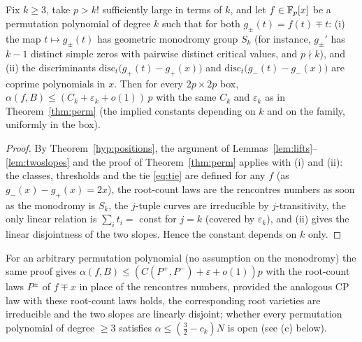 \begin{corollary}\label{cor:permgen}
Fix $k\ge3$, take $p>k!$ sufficiently large in terms of $k$, and let $f\in\mathbb{F}_p[x]$ be a permutation polynomial of degree $k$ such that for both $g_\pm(t)=f(t)\mp t$: (i) the map $t\mapsto g_\pm(t)$ has
geometric monodromy group $S_k$ (for instance, $g_\pm'$ has $k-1$ distinct simple zeros with pairwise distinct critical values, and $p\nmid k$), and (ii) the
discriminants $\mathrm{disc}_t\bigl(g_+(t)-g_+(x)\bigr)$ and $\mathrm{disc}_t\bigl(g_-(t)-g_-(x)\bigr)$ are coprime polynomials in $x$.  Then for every
$2p\times2p$ box, $\alpha(f,B)\le(C_k+\varepsilon_k+o(1))\,p$ with the same $C_k$ and $\varepsilon_k$ as in Theorem~\ref{thm:perm} (the implied constants
depending on $k$ and on the family, uniformly in the box).
\end{corollary}
\begin{proof}
By Theorem~\ref{hyp:positions}, the argument of Lemmas~\ref{lem:lifts}--\ref{lem:twoslopes} and the proof of Theorem~\ref{thm:perm} applies with (i) and (ii): the classes,
thresholds and the tie \eqref{eq:tie} are defined for any $f$ (as $g_-(x)-g_+(x)=2x$), the root-count laws are the rencontres numbers as soon as the
monodromy is $S_k$, the $j$-tuple curves are irreducible by $j$-transitivity, the only linear relation is $\sum_it_i=$ const for $j=k$ (covered by
$\varepsilon_k$), and (ii) gives the linear disjointness of the two slopes.  Hence the constant depends on $k$ only.
\end{proof}
For an arbitrary permutation polynomial (no assumption on the monodromy) the same proof gives $\alpha(f,B)\le(C(P^+,P^-)+\varepsilon+o(1))p$ with the
root-count laws $P^\pm$ of $f\mp x$ in place of the rencontres numbers, provided the analogous CP law with these root-count laws holds, the corresponding root varieties are irreducible and the two slopes are
linearly disjoint; whether every permutation polynomial of degree $\ge3$ satisfies $\alpha\le(\tfrac32-c_k)N$ is open (see (c) below).

